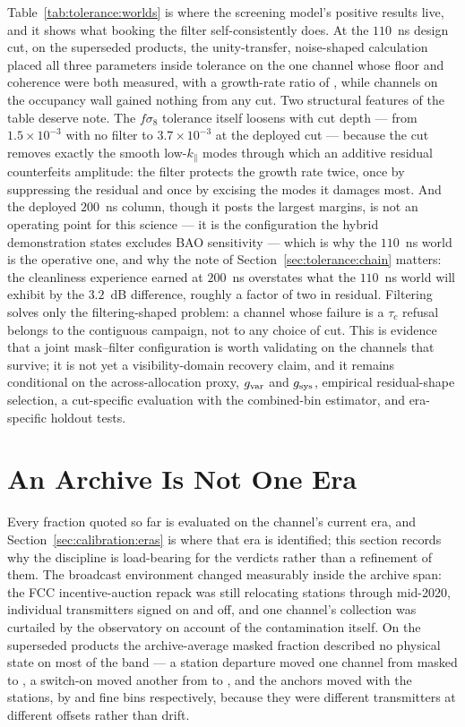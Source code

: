 Table~\ref{tab:tolerance:worlds} is where the screening model's positive results live, and it shows what booking the filter self-consistently does. At the $110$~ns design cut, on the superseded products, the unity-transfer, noise-shaped calculation placed all three parameters inside tolerance on the one channel whose floor and coherence were both measured, with a growth-rate ratio of , while channels on the occupancy wall gained nothing from any cut. Two structural features of the table deserve note. The $f\sigma_8$ tolerance itself loosens with cut depth --- from $1.5\times10^{-3}$ with no filter to $3.7\times10^{-3}$ at the deployed cut --- because the cut removes exactly the smooth low-$k_\parallel$ modes through which an additive residual counterfeits amplitude: the filter protects the growth rate twice, once by suppressing the residual and once by excising the modes it damages most. And the deployed $200$~ns column, though it posts the largest margins, is not an operating point for this science --- it is the configuration the hybrid demonstration states excludes BAO sensitivity \cite{chime2024hybrid} --- which is why the $110$~ns world is the operative one, and why the note of Section~\ref{sec:tolerance:chain} matters: the cleanliness experience earned at $200$~ns overstates what the $110$~ns world will exhibit by the $3.2$~dB difference, roughly a factor of two in residual. Filtering solves only the filtering-shaped problem: a channel whose failure is a $\tau_c$ refusal belongs to the contiguous campaign, not to any choice of cut. This is evidence that a joint mask--filter configuration is worth validating on the channels that survive; it is not yet a visibility-domain recovery claim, and it remains conditional on the across-allocation proxy, $g_{\rm var}$ and $g_{\rm sys}$, empirical residual-shape selection, a cut-specific evaluation with the combined-bin estimator, and era-specific holdout tests.

\section{An Archive Is Not One Era}
\label{sec:tolerance:eras}

Every fraction quoted so far is evaluated on the channel's current era, and Section~\ref{sec:calibration:eras} is where that era is identified; this section records why the discipline is load-bearing for the verdicts rather than a refinement of them. The broadcast environment changed measurably inside the archive span: the FCC incentive-auction repack was still relocating stations through mid-2020, individual transmitters signed on and off, and one channel's collection was curtailed by the observatory on account of the contamination itself. On the superseded products the archive-average masked fraction described no physical state on most of the band --- a station departure moved one channel from  masked to , a switch-on moved another from  to , and the anchors moved with the stations, by  and  fine bins respectively, because they were different transmitters at different offsets rather than drift.

